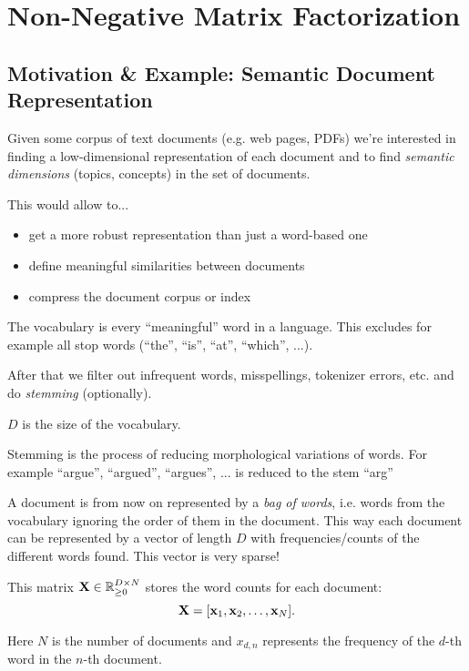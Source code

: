 \chapter{Non-Negative Matrix Factorization}

\section{Motivation \& Example: Semantic Document Representation}
Given some corpus of text documents (e.g. web pages, PDFs) we're interested in finding a low-dimensional representation of each document and to find \textit{semantic dimensions} (topics, concepts) in the set of documents.

This would allow to...
\begin{itemize}
\item get a more robust representation than just a word-based one
\item define meaningful similarities between documents
\item compress the document corpus or index
\end{itemize}

\begin{definition}[Vocabulary]
The vocabulary is every ``meaningful'' word in a language. This excludes for example all stop words (``the'', ``is'', ``at'', ``which'', ...).

After that we filter out infrequent words, misspellings, tokenizer errors, etc. and do \textit{stemming} (optionally).

\(D\) is the size of the vocabulary.
\end{definition}

\begin{remark}[Stemming]
Stemming is the process of reducing morphological variations of words. For example ``argue'', ``argued'', ``argues'', ... is reduced to the stem ``arg''
\end{remark}

A document is from now on represented by a \textit{bag of words}, i.e. words from the vocabulary ignoring the order of them in the document. This way each document can be represented by a vector of length \(D\) with frequencies/counts of the different words found. This vector is very sparse!

\begin{definition}
This matrix \(\boldsymbol{\mathrm{X}} \in \mathbb{R}_{\geq 0}^{D \times N}\) stores the word counts for each document:
\[
\boldsymbol{\mathrm{X}} = [\boldsymbol{\mathrm{x}}_1, \boldsymbol{\mathrm{x}}_2, \ldots, \boldsymbol{\mathrm{x}}_N].
\]

Here \(N\) is the number of documents and \(x_{d,n}\) represents the frequency of the \(d\)-th word in the \(n\)-th document.
\end{definition}

